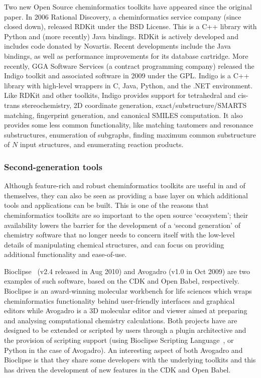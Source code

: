 \documentclass[10pt]{bmc_article}
\newenvironment{bmcformat}{\begin{raggedright}\baselineskip20pt\sloppy\setboolean{publ}{false}}{\end{raggedright}\baselineskip20pt\sloppy}
\begin{document}
\begin{bmcformat}
Two new Open Source cheminformatics toolkits have appeared since the
original paper. In 2006 Rational Discovery, a cheminformatics service
company (since closed down), released RDKit \cite{WebRDKit} under the
BSD License. This is a C++ library with Python and (more recently)
Java bindings. RDKit is actively developed and includes
code donated by Novartis. Recent developments include the Java
bindings, as well as performance improvements for its database
cartridge. More recently, GGA Software Services
(a contract programming company)
released the Indigo toolkit \cite{WebIndigo} and associated software
in 2009 under the GPL. Indigo is a C++ library with
high-level wrappers in C, Java, Python, and the .NET
environment. Like RDKit and other toolkits, Indigo provides support for
tetrahedral and cis-trans stereochemistry, 2D coordinate generation,
exact/substructure/SMARTS matching, fingerprint generation, and
canonical SMILES computation.
It also provides some less common functionality, like matching
tautomers and resonance substructures, enumeration of subgraphs,
finding maximum common substructure of $N$ input structures, and
enumerating reaction products.

\subsubsection*{Second-generation tools}

Although feature-rich and robust cheminformatics toolkits are useful
in and of themselves, they can also be seen as providing a base layer
on which additional tools and applications can be built. This is one
of the reasons that cheminformatics toolkits are so important to the
open source `ecosystem'; their availability lowers the barrier for the
development of a `second generation' of chemistry software that no
longer needs to concern itself with the low-level details of
manipulating chemical structures, and can focus on providing
additional functionality and ease-of-use.

Bioclipse~\cite{Spjuth:2007fk} (v2.4 released in Aug 2010) and Avogadro
\cite{WebAvogadro} (v1.0 in Oct 2009) are two examples of such software, based
on the CDK and Open Babel, respectively. Bioclipse is an award-winning
molecular workbench for life sciences
which wraps cheminformatics functionality behind user-friendly interfaces and
graphical editors while Avogadro is a 3D molecular editor and viewer aimed at
preparing and analysing computational chemistry calculations. Both
projects have are designed to be extended or scripted by users through
a plugin architective and the provision of scripting support (using
Bioclipse Scripting Language~\cite{Bioclipse2}, or Python in the case
of Avogadro).
An interesting
aspect of both Avogadro and Bioclipse is that they share some developers
with the underlying toolkits and this has driven the development of new
features in the CDK and Open Babel.


\end{bmcformat}
\end{document}
